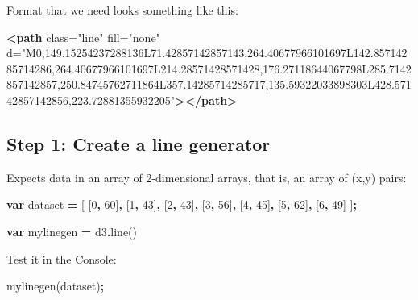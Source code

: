 \documentclass[
  openany]{book}
\newenvironment{Shaded}{\begin{snugshade}}{\end{snugshade}}
\newcommand{\DecValTok}[1]{\textcolor[rgb]{0.00,0.00,0.81}{#1}}
\newcommand{\FunctionTok}[1]{\textcolor[rgb]{0.00,0.00,0.00}{#1}}
\newcommand{\KeywordTok}[1]{\textcolor[rgb]{0.13,0.29,0.53}{\textbf{#1}}}
\newcommand{\NormalTok}[1]{#1}
\newcommand{\OperatorTok}[1]{\textcolor[rgb]{0.81,0.36,0.00}{\textbf{#1}}}
\newcommand{\OtherTok}[1]{\textcolor[rgb]{0.56,0.35,0.01}{#1}}
\newcommand{\StringTok}[1]{\textcolor[rgb]{0.31,0.60,0.02}{#1}}
\begin{document}
Format that we need looks something like this:

\begin{Shaded}
\begin{Highlighting}[]
\KeywordTok{\textless{}path}\OtherTok{ class=}\StringTok{"line"}\OtherTok{ fill=}\StringTok{"none"}\OtherTok{ d=}\StringTok{"M0,149.15254237288136L71.42857142857143,264.40677966101697L142.85714285714286,264.40677966101697L214.28571428571428,176.27118644067798L285.7142857142857,250.84745762711864L357.14285714285717,135.59322033898303L428.57142857142856,223.72881355932205"}\KeywordTok{\textgreater{}\textless{}/path\textgreater{}}
\end{Highlighting}
\end{Shaded}

\hypertarget{step-1-create-a-line-generator}{%
\subsection{Step 1: Create a line generator}\label{step-1-create-a-line-generator}}

Expects data in an array of 2-dimensional arrays, that is, an array of (x,y) pairs:

\begin{Shaded}
\begin{Highlighting}[]
\KeywordTok{var}\NormalTok{ dataset }\OperatorTok{=}\NormalTok{ [ [}\DecValTok{0}\OperatorTok{,} \DecValTok{60}\NormalTok{]}\OperatorTok{,}\NormalTok{ [}\DecValTok{1}\OperatorTok{,} \DecValTok{43}\NormalTok{]}\OperatorTok{,}\NormalTok{ [}\DecValTok{2}\OperatorTok{,} \DecValTok{43}\NormalTok{]}\OperatorTok{,}\NormalTok{ [}\DecValTok{3}\OperatorTok{,} \DecValTok{56}\NormalTok{]}\OperatorTok{,}\NormalTok{ [}\DecValTok{4}\OperatorTok{,} \DecValTok{45}\NormalTok{]}\OperatorTok{,}\NormalTok{ [}\DecValTok{5}\OperatorTok{,} \DecValTok{62}\NormalTok{]}\OperatorTok{,}\NormalTok{ [}\DecValTok{6}\OperatorTok{,} \DecValTok{49}\NormalTok{] ]}\OperatorTok{;}

\KeywordTok{var}\NormalTok{ mylinegen }\OperatorTok{=}\NormalTok{ d3}\OperatorTok{.}\FunctionTok{line}\NormalTok{()}
\end{Highlighting}
\end{Shaded}

Test it in the Console:

\begin{Shaded}
\begin{Highlighting}[]
\NormalTok{mylinegen(dataset)}\OperatorTok{;}
\end{Highlighting}
\end{Shaded}
\end{document}
